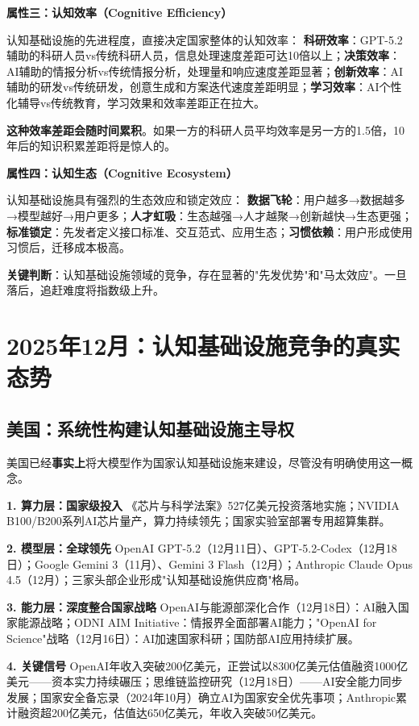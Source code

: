 \textbf{属性三：认知效率（Cognitive Efficiency）}

认知基础设施的先进程度，直接决定国家整体的认知效率：
\textbf{科研效率}：GPT-5.2辅助的科研人员vs传统科研人员，信息处理速度差距可达10倍以上；\textbf{决策效率}：AI辅助的情报分析vs传统情报分析，处理量和响应速度差距显著；\textbf{创新效率}：AI辅助的研发vs传统研发，创意生成和方案迭代速度差距明显；\textbf{学习效率}：AI个性化辅导vs传统教育，学习效果和效率差距正在拉大。

\textbf{这种效率差距会随时间累积}。如果一方的科研人员平均效率是另一方的1.5倍，10年后的知识积累差距将是惊人的。

\textbf{属性四：认知生态（Cognitive Ecosystem）}

认知基础设施具有强烈的生态效应和锁定效应：
\textbf{数据飞轮}：用户越多→数据越多→模型越好→用户更多；\textbf{人才虹吸}：生态越强→人才越聚→创新越快→生态更强；\textbf{标准锁定}：先发者定义接口标准、交互范式、应用生态；\textbf{习惯依赖}：用户形成使用习惯后，迁移成本极高。

\textbf{关键判断}：认知基础设施领域的竞争，存在显著的"先发优势"和"马太效应"。一旦落后，追赶难度将指数级上升。

\section{2025年12月：认知基础设施竞争的真实态势}

\subsection{美国：系统性构建认知基础设施主导权}

美国已经\textbf{事实上}将大模型作为国家认知基础设施来建设，尽管没有明确使用这一概念。

\textbf{1. 算力层：国家级投入}
《芯片与科学法案》527亿美元投资落地实施；NVIDIA B100/B200系列AI芯片量产，算力持续领先；国家实验室部署专用超算集群。

\textbf{2. 模型层：全球领先}
OpenAI GPT-5.2（12月11日）、GPT-5.2-Codex（12月18日）；Google Gemini 3（11月）、Gemini 3 Flash（12月）；Anthropic Claude Opus 4.5（12月）；三家头部企业形成"认知基础设施供应商"格局。

\textbf{3. 能力层：深度整合国家战略}
OpenAI与能源部深化合作（12月18日）：AI融入国家能源战略；ODNI AIM Initiative：情报界全面部署AI能力；"OpenAI for Science"战略（12月16日）：AI加速国家科研；国防部AI应用持续扩展。

\textbf{4. 关键信号}
OpenAI年收入突破200亿美元，正尝试以8300亿美元估值融资1000亿美元——资本实力持续碾压；思维链监控研究（12月18日）——AI安全能力同步发展；国家安全备忘录（2024年10月）确立AI为国家安全优先事项；Anthropic累计融资超200亿美元，估值达650亿美元，年收入突破50亿美元。

